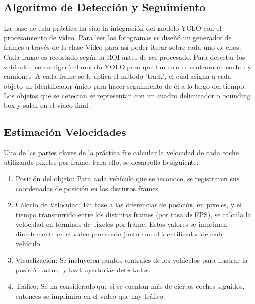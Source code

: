 \subsection{Algoritmo de Detección y Seguimiento}
La base de esta práctica ha sido la integración del modelo YOLO con el procesamiento de vídeo. 
Para leer los fotogramas se diseñó un generador de frames a través de la clase Video para así poder iterar sobre cada uno de ellos.  Cada frame es recortado según la ROI antes de ser procesado.
Para detectar los vehículos, se configuró el modelo YOLO para que tan solo se centrara en coches y camiones.  A cada frame se le aplica el método 'track', el cual asigna a cada objeto un identificador único para hacer seguimiento de él a lo largo del tiempo.
Los objetos que se detectan se representan con un cuadro delimitador o bounding box y salen en el vídeo final.


\subsection{Estimación Velocidades}
Una de las partes claves de la práctica fue calcular la velocidad de cada coche utilizando píxeles por frame.  Para ello, se desarrolló lo siguiente:
\begin{enumerate}
    \item Posición del objeto:
    Para cada vehículo que se reconoce, se registraron sus coordenadas de posición en los distintos frames.
    \item Cálculo de Velocidad:
    En base a las diferencias de posición, en píxeles, y el tiempo transcurrido entre los distintos frames (por tasa de FPS), se calcula la velocidad en términos de píxeles por frame.
    Estos valores se imprimen directamente en el vídeo procesado junto con el identificador de cada vehículo.
    \item Visualización:
    Se incluyeron puntos centrales de los vehículos para ilustrar la posición actual y las trayectorias detectadas.
    \item Tráfico:
    Se ha considerado que si se cuentan más de ciertos coches seguidos, entonces se imprimirá en el vídeo que hay tráfico.
\end{enumerate}

